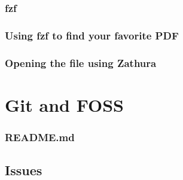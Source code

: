 \documentclass[12pt]{article}
\begin{document}
\subsubsection{fzf}



\subsubsection{Using fzf to find your favorite PDF}



\subsubsection{Opening the file using Zathura}

\section{Git and FOSS}
\subsubsection{README.md}

\subsection{Issues}
\end{document}
